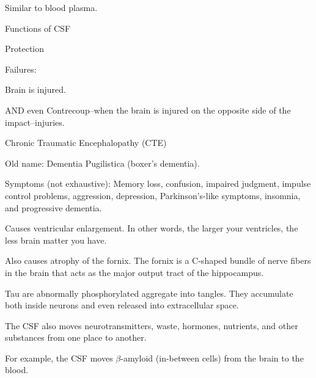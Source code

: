 \begin{coloredlist}
    \item Similar to blood plasma.
    \item Functions of CSF
    \begin{coloredlist}
        \item Protection
        \begin{coloredlist}
            \item Failures:
            \begin{coloredlist}
                \item Brain is injured.
                \item AND even Contrecoup--when the brain is injured on the opposite side of the impact--injuries.
                \item Chronic Traumatic Encephalopathy (CTE)
                \begin{coloredlist}
                    \item Old name: Dementia Pugilistica (boxer's dementia).
                    \item Symptoms (not exhaustive): Memory loss, confusion, impaired judgment, impulse control problems, aggression, depression, Parkinson's-like symptoms, insomnia, and progressive dementia.
                    \item Causes ventricular enlargement. In other words, the larger your ventricles, the less brain matter you have.
                    \item Also causes atrophy of the fornix. The fornix is a C-shaped bundle of nerve fibers in the brain that acts as the major output tract of the hippocampus.
                    \item Tau are abnormally phosphorylated aggregate into tangles. They accumulate both inside neurons and even released into extracellular space.
                \end{coloredlist}
            \end{coloredlist}
        \end{coloredlist}
        \item The CSF also moves neurotransmitters, waste, hormones, nutrients, and other substances from one place to another.
        \begin{coloredlist}
            \item For example, the CSF moves \(\beta\)-amyloid (in-between cells) from the brain to the blood.
        \end{coloredlist}
    \end{coloredlist}

\end{coloredlist}
